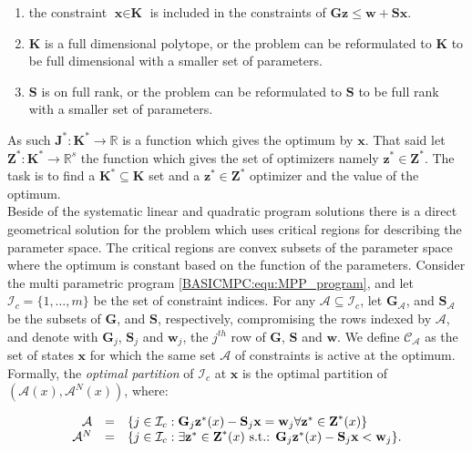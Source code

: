     \begin{enumerate}
    \item the constraint $\textbf{x}\in\textbf{K}$ is included in the constraints of $\textbf{Gz}\leq\textbf{w}+\textbf{Sx}$.
    \item $\textbf{K}$ is a full dimensional polytope, or the problem can be reformulated to $\textbf{K}$ to be full dimensional with a smaller set of parameters.
    \item $\textbf{S}$ is on full rank, or the problem can be reformulated to $\textbf{S}$ to be full rank with a smaller set of parameters.
    \end{enumerate}

    As such $\textbf{J}^*:\textbf{K}^*\rightarrow\mathbb{R}$ is a function which gives the optimum by $\textbf{x}$. That said let $\textbf{Z}^*:\textbf{K}^*\rightarrow\mathbb{R}^s$ the function which gives the set of optimizers namely $\textbf{z}^*\in\textbf{Z}^*$. The task is to find a $\textbf{K}^*\subseteq\textbf{K}$ set and a $\textbf{z}^*\in\textbf{Z}^*$ optimizer and the value of the optimum.\\
    Beside of the systematic linear and quadratic program solutions \cite{borrelli2017predictive} there is a direct geometrical solution for the problem which uses critical regions for describing the parameter space. The critical regions are convex subsets of the parameter space where the optimum is constant based on the function of the parameters.
    Consider the multi parametric program \ref{BASICMPC:equ:MPP_program}, and let $\mathcal{I}_c=\{1,\dots,m\}$ be the set of constraint indices. For any $\mathcal{A}\subseteq\mathcal{I}_c$, let $\textbf{G}_{\mathcal{A}}$, and $\textbf{S}_{\mathcal{A}}$ be the subsets of $\textbf{G}$, and $\textbf{S}$, respectively, compromising the rows indexed by $\mathcal{A}$, and denote with $\textbf{G}_j$, $\textbf{S}_j$ and $\textbf{w}_j$, the $j^{th}$ row of $\textbf{G}$, $\textbf{S}$ and $\textbf{w}$. We define $\mathcal{C}_{\mathcal{A}}$ as the set of states $\textbf{x}$ for which the same set $\mathcal{A}$ of constraints is active at the optimum. Formally, the \emph{optimal partition} of $\mathcal{I}_c$ at $\textbf{x}$ is the optimal partition of $(\mathcal{A}(x),\mathcal{A}^N(x))$, where:

    \begin{equation}
    \begin{array}{rcl}
            \mathcal{A}&=&\{j\in\mathcal{I}_c:\textbf{G}_j\textbf{z}^*(x)-\textbf{S}_j\textbf{x}=\textbf{w}_j\forall\textbf{z}^*\in\textbf{Z}^*(x)\}\\
            \mathcal{A}^N&=&\{j\in\mathcal{I}_c:\exists\textbf{z}^*\in\textbf{Z}^*(x)\textnormal{ s.t.: }\textbf{G}_j\textbf{z}^*(x)-\textbf{S}_j\textbf{x}<\textbf{w}_j\}.
        \end{array}
        \label{BASICMPC:equ:MPP_stateset_optimal partition}
    \end{equation}

